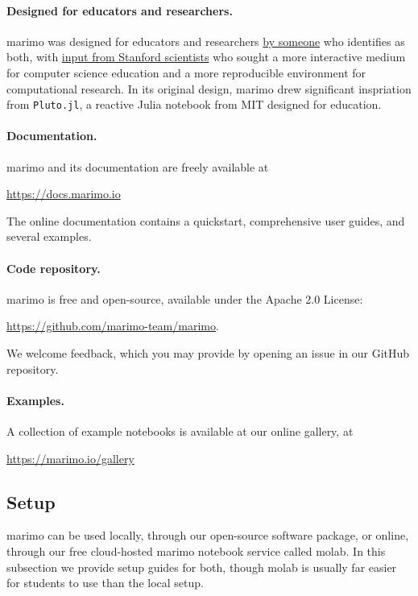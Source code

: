 \documentclass{article}
\begin{document}
\paragraph{Designed for educators and researchers.} marimo was designed for
educators and researchers \href{https://www.akshayagrawal.com}{by someone} who identifies as both, with \href{
  https://marimo.io/blog/slac-marimo}{input from Stanford scientists} who
sought a more interactive medium for computer science education and a more
reproducible environment for computational research. In its original design,
marimo drew significant inspriation from \texttt{Pluto.jl}, a reactive Julia
notebook from MIT designed for education.

\paragraph{Documentation.} marimo and its documentation are freely available at
\begin{center}
\url{https://docs.marimo.io}
\end{center}
The online documentation contains a quickstart, comprehensive user guides, and
several examples.

\paragraph{Code repository.} marimo is free and open-source, available under
the Apache 2.0 License:
\begin{center}
  \url{https://github.com/marimo-team/marimo}.
\end{center}
We welcome feedback, which you may provide by opening an issue in our GitHub
repository.

\paragraph{Examples.} A collection of example notebooks is available at our online gallery,
at
\begin{center}
  \url{https://marimo.io/gallery}
\end{center}

\subsection{Setup}

marimo can be used locally, through our open-source software package, or online,
through our free cloud-hosted marimo notebook service called molab. In this subsection
we provide setup guides for both, though molab is usually
far easier for students to use than the local setup.
\end{document}
